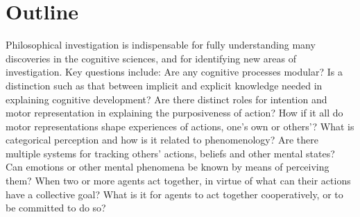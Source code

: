 \documentclass[12pt,\papersize]{extarticle}
\date{}
\begin{document}
\setlength\footnotesep{1em}






\maketitle

\setcounter{secnumdepth}{-1}



\section{Outline}
Philosophical investigation is indispensable for fully understanding many discoveries in the cognitive sciences, and for identifying new areas of investigation. Key questions include: Are any cognitive processes modular? Is a distinction such as that between implicit and explicit knowledge needed in explaining cognitive development? Are there distinct roles for intention and motor representation in explaining the purposiveness of action? How if it all do motor representations shape experiences of actions, one’s own or others’? What is categorical perception and how is it related to phenomenology? Are there multiple systems for tracking others’ actions, beliefs and other mental states? Can emotions or other mental phenomena be known by means of perceiving them? When two or more agents act together, in virtue of what can their actions have a collective goal? What is it for agents to act together cooperatively, or to be committed to do so?
\end{document}
